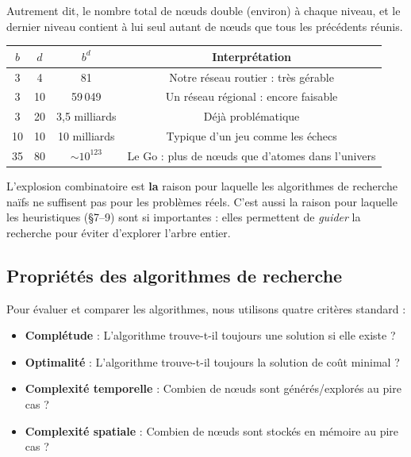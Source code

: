 \documentclass[11pt,a4paper]{article}
\begin{document}
Autrement dit, le nombre total de nœuds double (environ) à chaque niveau, et le dernier niveau contient à lui seul autant de nœuds que tous les précédents réunis.

\begin{center}
\begin{tabular}{cccc}
\toprule
$b$ & $d$ & $b^d$ & \textbf{Interprétation} \\
\midrule
3 & 4 & 81 & Notre réseau routier : très gérable \\
3 & 10 & 59\,049 & Un réseau régional : encore faisable \\
3 & 20 & 3,5 milliards & Déjà problématique \\
10 & 10 & 10 milliards & Typique d'un jeu comme les échecs \\
35 & 80 & $\sim 10^{123}$ & Le Go : plus de nœuds que d'atomes dans l'univers \\
\bottomrule
\end{tabular}
\end{center}

\begin{retenirbox}
L'explosion combinatoire est \textbf{la} raison pour laquelle les algorithmes de recherche naïfs ne suffisent pas pour les problèmes réels. C'est aussi la raison pour laquelle les heuristiques (§7--9) sont si importantes : elles permettent de \textit{guider} la recherche pour éviter d'explorer l'arbre entier.
\end{retenirbox}

\subsection{Propriétés des algorithmes de recherche}
\label{sec:proprietes}

Pour évaluer et comparer les algorithmes, nous utilisons quatre critères standard :

\begin{definitionbox}
\begin{itemize}
    \item \textbf{Complétude} : L'algorithme trouve-t-il toujours une solution si elle existe ?
    \item \textbf{Optimalité} : L'algorithme trouve-t-il toujours la solution de coût minimal ?
    \item \textbf{Complexité temporelle} : Combien de nœuds sont générés/explorés au pire cas ?
    \item \textbf{Complexité spatiale} : Combien de nœuds sont stockés en mémoire au pire cas ?
\end{itemize}
\end{definitionbox}
\end{document}
